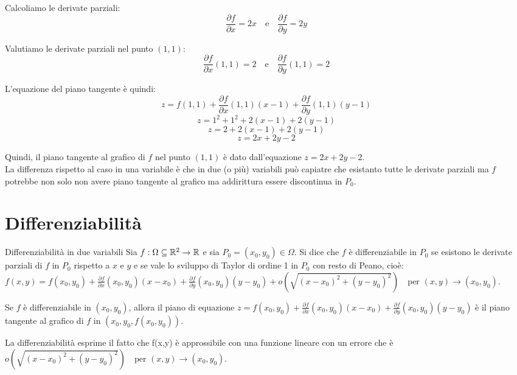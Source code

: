 Calcoliamo le derivate parziali:
\[
\frac{\partial f}{\partial x} = 2x \quad \text{e} \quad \frac{\partial f}{\partial y} = 2y
\]

Valutiamo le derivate parziali nel punto $(1,1)$:
\[
\frac{\partial f}{\partial x}(1,1) = 2 \quad \text{e} \quad \frac{\partial f}{\partial y}(1,1) = 2
\]

L'equazione del piano tangente è quindi:
\[
z = f(1,1) + \frac{\partial f}{\partial x}(1,1)(x-1) + \frac{\partial f}{\partial y}(1,1)(y-1)
\]
\[
z = 1^2 + 1^2 + 2(x-1) + 2(y-1)
\]
\[
z = 2 + 2(x-1) + 2(y-1)
\]
\[
z = 2x + 2y - 2
\]

Quindi, il piano tangente al grafico di $f$ nel punto $(1,1)$ è dato dall'equazione $z = 2x + 2y - 2$.\\

La differenza rispetto al caso in una variabile è che in due (o più) variabili può capiatre che esistanto tutte le derivate parziali ma $f$ potrebbe non solo non avere piano tangente al grafico ma addirittura essere discontinua in $P_0$.

\section{Differenziabilità}
\begin{definizione}{Differenziabilità in due variabili}
Sia $f:\Omega \subseteq \mathbb{R}^2 \rightarrow \mathbb{R}$ e sia $P_0 = (x_0,y_0) \in \Omega$. Si dice che $f$ è differenziabile in $P_0$ se esistono le derivate parziali di $f$ in $P_0$ rispetto a $x$ e $y$ e se vale lo sviluppo di Taylor di ordine 1 in $P_0$ con resto di Peano, cioè: $f(x,y)=f(x_0,y_0)+\frac{\partial f}{\partial x}(x_0,y_0)(x-x_0)+\frac{\partial f}{\partial y}(x_0,y_0)(y-y_0)+o(\sqrt{(x-x_0)^2+(y-y_0)^2}) \quad \text{per }(x,y) \rightarrow (x_0,y_0)$.
\end{definizione}

\begin{osservazione}{}
Se $f$ è differenziabile in $(x_0,y_0)$, allora il piano di equazione $z=f(x_0,y_0)+\frac{\partial f}{\partial x}(x_0,y_0)(x-x_0)+\frac{\partial f}{\partial y}(x_0,y_0)(y-y_0)$ è il piano tangente al grafico di $f$ in $(x_0,y_0,f(x_0,y_0))$.
\end{osservazione}
\begin{osservazione}{}
  La differenziabilità esprime il fatto che f(x,y) è approssibile con una funzione lineare con un errore che è $o(\sqrt{(x-x_0)^2+(y-y_0)^2}) \quad \text{per }(x,y) \rightarrow (x_0,y_0)$.
\end{osservazione}


